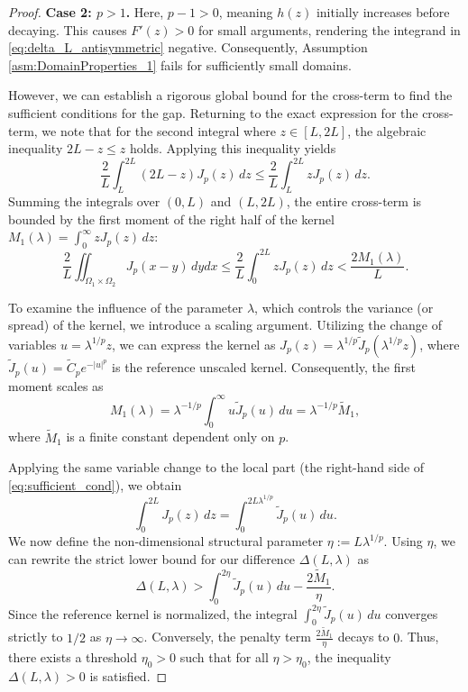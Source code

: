 \documentclass[11pt, a4paper]{article}
\theoremstyle{break}
\theoremstyle{break}
\theoremstyle{break}
\theoremstyle{break}
\theoremstyle{break}
\theoremstyle{break}
\theoremstyle{break}
\theoremstyle{break}
\theoremstyle{break}
\begin{document}
\begin{proof}
    \textbf{Case 2: $p > 1$.} 
    Here, $p-1 > 0$, meaning $h(z)$ initially increases before decaying. This causes $F'(z) > 0$ for small arguments, rendering the integrand in \eqref{eq:delta_L_antisymmetric} negative. Consequently, Assumption \ref{asm:DomainProperties_1} fails for sufficiently small domains. 
    
    However, we can establish a rigorous global bound for the cross-term to find the sufficient conditions for the gap. Returning to the exact expression for the cross-term, we note that for the second integral where $z \in [L, 2L]$, the algebraic inequality $2L-z \le z$ holds. Applying this inequality yields
    \begin{equation}
        \label{eq:cross_term_bound_derivation}
        \frac{2}{L} \int_L^{2L} (2L-z) J_p(z) \, dz \le \frac{2}{L} \int_L^{2L} z J_p(z) \, dz.
    \end{equation}
    Summing the integrals over $(0, L)$ and $(L, 2L)$, the entire cross-term is bounded by the first moment of the right half of the kernel $M_1(\lambda) = \int_0^\infty z J_p(z) \, dz$:
    \begin{equation*}
        \frac{2}{L} \iint_{\Omega_1 \times \Omega_2} J_p(x-y) \, dy dx \le \frac{2}{L} \int_0^{2L} z J_p(z) \, dz < \frac{2 M_1(\lambda)}{L}.
    \end{equation*}
    
    To examine the influence of the parameter $\lambda$, which controls the variance (or spread) of the kernel, we introduce a scaling argument. Utilizing the change of variables $u = \lambda^{1/p} z$, we can express the kernel as $J_p(z) = \lambda^{1/p} \tilde{J}_p(\lambda^{1/p} z)$, where $\tilde{J}_p(u) = \tilde{C}_p e^{-|u|^p}$ is the reference unscaled kernel. Consequently, the first moment scales as 
    \begin{equation*}
        M_1(\lambda) = \lambda^{-1/p} \int_0^\infty u \tilde{J}_p(u) \, du = \lambda^{-1/p} \tilde{M}_1,
    \end{equation*}
    where $\tilde{M}_1$ is a finite constant dependent only on $p$. 
    
    Applying the same variable change to the local part (the right-hand side of \eqref{eq:sufficient_cond}), we obtain
    \begin{equation*}
        \int_0^{2L} J_p(z) \, dz = \int_0^{2 L \lambda^{1/p}} \tilde{J}_p(u) \, du.
    \end{equation*}
    We now define the non-dimensional structural parameter $\eta := L \lambda^{1/p}$. Using $\eta$, we can rewrite the strict lower bound for our difference $\Delta(L, \lambda)$ as
    \begin{equation*}
        \Delta(L, \lambda) > \int_0^{2\eta} \tilde{J}_p(u) \, du - \frac{2 \tilde{M}_1}{\eta}.
    \end{equation*}
    Since the reference kernel is normalized, the integral $\int_0^{2\eta} \tilde{J}_p(u) \, du$ converges strictly to $1/2$ as $\eta \to \infty$. Conversely, the penalty term $\frac{2 \tilde{M}_1}{\eta}$ decays to $0$. Thus, there exists a threshold $\eta_0 > 0$ such that for all $\eta > \eta_0$, the inequality $\Delta(L, \lambda) > 0$ is satisfied. 
\end{proof}
\end{document}
